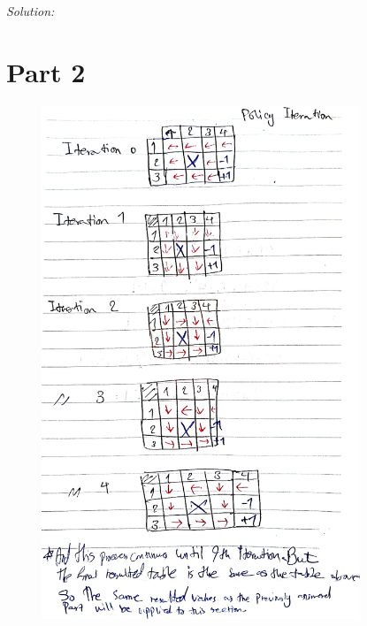 \documentclass[a4paper, 11pt]{article}
\newenvironment{solution}
    {\textit{Solution:}}
    {}
\begin{document}
{\begin{solution}
 	 	\section*{\small Part 2}
 	\begin{figure}[H]
 		\centering
 		\includegraphics[width=0.85\textwidth]{3.jpg}
 	\end{figure}

\end{solution}}
\end{document}
